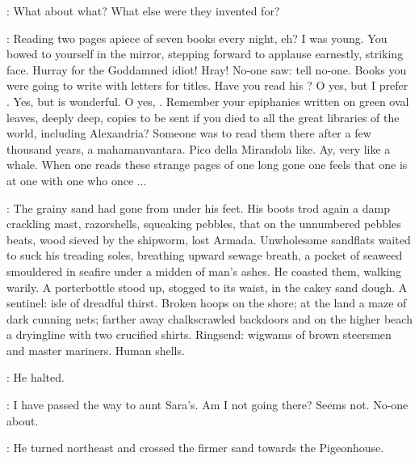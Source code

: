 \StephenInt:
What about what?
What else were they invented for?

\StephenInt:
Reading two pages apiece of seven books every night, eh?
I was young.
You bowed to yourself in the mirror,
stepping forward to applause earnestly, striking face.
Hurray for the Goddamned idiot!
Hray!
No-one saw:
tell no-one.
Books you were going to write with letters for titles.
Have you read his ?
O yes, but I prefer .
Yes, but  is wonderful.
O yes, .
Remember your epiphanies written on green oval leaves,
deeply deep,
copies to be sent if you died to all the great libraries of the world,
including Alexandria?
Someone was to read them there after a few thousand years,
a mahamanvantara.
Pico della Mirandola like.
Ay, very like a whale.
When one reads these strange pages of one long gone
one feels that one is at one with one who once ...

:
The grainy sand had gone from under his feet.
His boots trod again a damp crackling mast,
razorshells, squeaking pebbles,
that on the unnumbered pebbles beats,
wood sieved by the shipworm,
lost Armada.
Unwholesome sandflats waited to suck his treading soles,
breathing upward sewage breath,
a pocket of seaweed smouldered in seafire under a midden of man's ashes.
He coasted them, walking warily.
A porterbottle stood up,
stogged to its waist, in the cakey sand dough.
A sentinel:
isle of dreadful thirst.
Broken hoops on the shore;
at the land a maze of dark cunning nets;
farther away chalkscrawled backdoors
and on the higher beach
a dryingline with two crucified shirts.
Ringsend:
wigwams of brown steersmen and master mariners.
Human shells.

:
He halted.

\StephenInt:
I have passed the way to aunt Sara's.
Am I not going there?
Seems not.
No-one about.

:
He turned northeast and crossed the firmer sand
towards the Pigeonhouse.
